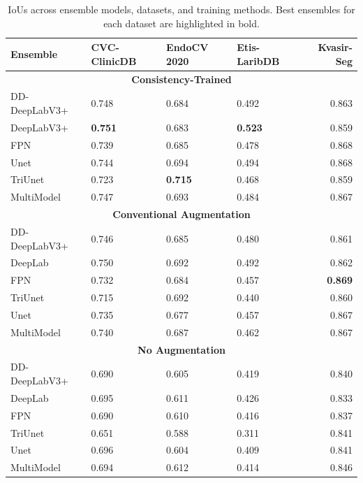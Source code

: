 \begin{table}[htb]
    \centering
    \begin{tabularx}{\linewidth}{lXXXr}
\toprule
Ensemble  & CVC-ClinicDB & EndoCV 2020 & Etis-LaribDB & Kvasir-Seg \\
\midrule
\multicolumn{5}{c}{\textbf{Consistency-Trained}}\\
\midrule
DD-DeepLabV3+   & 0.748 &0.684 &0.492 &0.863 \\
DeepLabV3+      & \textbf{0.751} & 0.683 & \textbf{0.523} &0.859 \\
FPN             & 0.739 & 0.685 &0.478 & 0.868 \\
Unet            & 0.744 & 0.694 &0.494 & 0.868 \\
TriUnet         & 0.723 & \textbf{0.715} & 0.468 & 0.859 \\
MultiModel      & 0.747 & 0.693 &0.484 &0.867 \\
\midrule
\multicolumn{5}{c}{\textbf{Conventional Augmentation}}\\
\midrule
DD-DeepLabV3+   & 0.746 & 0.685 & 0.480 & 0.861 \\
DeepLab         & 0.750 & 0.692 & 0.492 & 0.862 \\
FPN             & 0.732 & 0.684 & 0.457 & \textbf{0.869} \\
TriUnet         & 0.715 & 0.692 & 0.440 & 0.860 \\
Unet            & 0.735 & 0.677 & 0.457 & 0.867 \\
MultiModel      & 0.740 & 0.687 & 0.462 & 0.867 \\
\midrule
\multicolumn{5}{c}{\textbf{No Augmentation}}\\
\midrule
DD-DeepLabV3+  & 0.690 & 0.605 & 0.419 & 0.840 \\ 
DeepLab        & 0.695 & 0.611 & 0.426 & 0.833 \\ 
FPN            & 0.690 & 0.610 & 0.416 & 0.837 \\ 
TriUnet        & 0.651 & 0.588 & 0.311 & 0.841 \\ 
Unet           & 0.696 & 0.604 & 0.409 & 0.841 \\
MultiModel     & 0.694 & 0.612 & 0.414 & 0.846 \\
\bottomrule
\end{tabularx}
    \caption[IoUs across ensemble models and datasets. ]{IoUs across ensemble models, datasets, and training methods. Best ensembles for each dataset are highlighted in bold.}
    \label{tab:ensembles}
\end{table}


